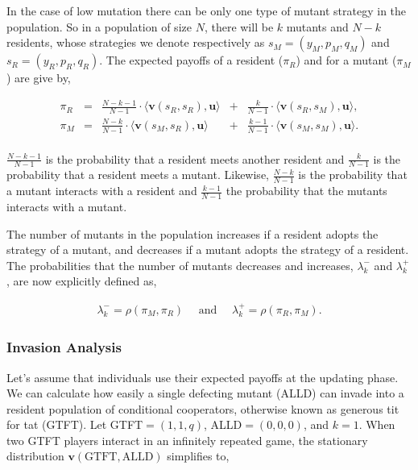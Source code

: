 \documentclass[11pt]{article}
\theoremstyle{plainCl1}
\theoremstyle{plainCl2}
\begin{document}
In the case of low mutation there can be only one type of mutant strategy in the
population. So in a population of size \(N\), there will be \(k\) mutants and
\(N - k\) residents, whose strategies we denote respectively as \(s_M =(y_M,
p_M, q_M)\) and \(s_R = (y_R, p_R, q_R)\).
The expected payoffs of a resident (\(\pi_R\)) and for a
mutant (\(\pi_M\)) are give by,

\begin{equation} \label{Eq:ExpPay}
  \begin{array}{lcrcr}
  \displaystyle \pi_R & = &\displaystyle \frac{N\!-\!k\!-\!1}{N-1}\cdot \langle\mathbf{v}(s_R,s_R),\mathbf{u}\rangle	&+	&\displaystyle\frac{k}{N-1}\cdot \langle\mathbf{v}(s_R,s_M),\mathbf{u}\rangle,\\[0.5cm]
  \displaystyle \pi_M & = &\displaystyle\frac{N-k}{N-1}\cdot \langle\mathbf{v}(s_M,s_R),\mathbf{u}\rangle&+	&\displaystyle\frac{k-1}{N-1}\cdot \langle\mathbf{v}(s_M,s_M),\mathbf{u}\rangle.\\
  \end{array}
\end{equation}

\(\frac{N\!-\!k\!-\!1}{N-1}\) is the probability that a resident meets another
resident and \(\frac{k}{N-1}\) is the probability that a resident meets a
mutant. Likewise, \(\frac{N-k}{N-1}\) is the probability that a mutant interacts
with a resident and \(\frac{k-1}{N-1}\) the probability that the mutants
interacts with a mutant.

The number of mutants in the population increases if a resident adopts the strategy
of a mutant, and decreases if a mutant adopts the strategy of a resident. The
probabilities that the number of mutants decreases and increases,
\(\lambda^-_k\) and \(\lambda^+_k\), are now explicitly defined as,

\begin{align*}
  \lambda^-_k \!=\!\rho(\pi_M, \pi_R) \quad \text{ and } \quad \lambda^+_k \!=\!\rho(\pi_R, \pi_M).
\end{align*}

\subsubsection*{Invasion Analysis}

Let's assume that individuals use their expected payoffs at the updating phase.
We can calculate how easily a single defecting mutant (ALLD) can invade into a
resident population of conditional cooperators, otherwise known as generous tit
for tat (GTFT). Let GTFT\(= (1, 1, q)\), ALLD\(= (0, 0, 0)\), and \(k =
1\). When two GTFT players interact in an infinitely repeated game, the
stationary distribution \(\mathbf{v}(\text{GTFT}, \text{ALLD})\) 
simplifies to,
\end{document}
